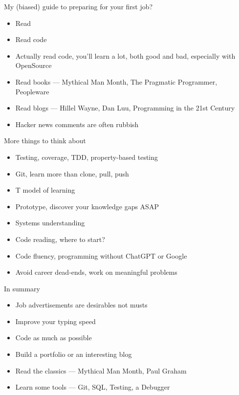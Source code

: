 \documentclass{beamer}
\begin{document}
\begin{frame}{My (biased) guide to preparing for your first job?}
\begin{itemize}
\item Read
\item Read code
\item Actually read code, you'll learn a lot, both good and bad, especially with OpenSource
\item Read books --- Mythical Man Month, The Pragmatic Programmer, Peopleware
\item Read blogs --- Hillel Wayne, Dan Luu, Programming in the 21st Century
\item Hacker news comments are often rubbish
\end{itemize}
\end{frame}

\begin{frame}{More things to think about}
\begin{itemize}
\item Testing, coverage, TDD, property-based testing
\item Git, learn more than clone, pull, push
\item T model of learning
\item Prototype, discover your knowledge gaps ASAP
\item Systems understanding
\item Code reading, where to start?
\item Code fluency, programming without ChatGPT or Google
\item Avoid career dead-ends, work on meaningful problems
\end{itemize}
\end{frame}

\begin{frame}{In summary}
\begin{itemize}
\item Job advertisements are desirables not musts
\item Improve your typing speed
\item Code as much as possible
\item Build a portfolio or an interesting blog
\item Read the classics --- Mythical Man Month, Paul Graham
\item Learn some tools --- Git, SQL, Testing, a Debugger
\end{itemize}
\end{frame}
\end{document}
